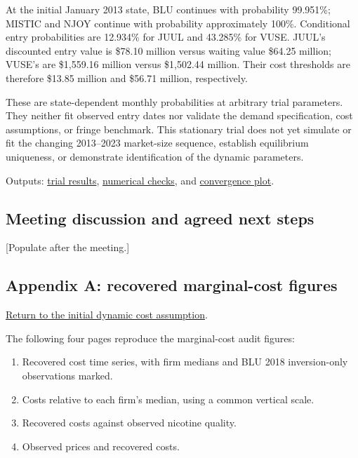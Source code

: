 \documentclass[10pt,]{article}
\providecommand{\tightlist}{%
  \setlength{\itemsep}{0pt}\setlength{\parskip}{0pt}}
\begin{document}
At the initial January 2013 state, BLU continues with probability
99.951\%; MISTIC and NJOY continue with probability approximately 100\%.
Conditional entry probabilities are 12.934\% for JUUL and 43.285\% for
VUSE. JUUL's discounted entry value is \$78.10 million versus waiting
value \$64.25 million; VUSE's are \$1,559.16 million versus \$1,502.44
million. Their cost thresholds are therefore \$13.85 million and \$56.71
million, respectively.

These are state-dependent monthly probabilities at arbitrary trial
parameters. They neither fit observed entry dates nor validate the
demand specification, cost assumptions, or fringe benchmark. This
stationary trial does not yet simulate or fit the changing 2013--2023
market-size sequence, establish equilibrium uniqueness, or demonstrate
identification of the dynamic parameters.

Outputs:
\href{../../output/dynamic_entry_exit/manual_dynamic_trial_2026-11-06/initial_state_results.csv}{trial
results},
\href{../../output/dynamic_entry_exit/manual_dynamic_trial_2026-11-06/dynamic_validation.csv}{numerical
checks}, and
\href{../../output/dynamic_entry_exit/manual_dynamic_trial_2026-11-06/dynamic_convergence.pdf}{convergence
plot}.

\subsection{Meeting discussion and agreed next
steps}\label{meeting-discussion-and-agreed-next-steps}

{[}Populate after the meeting.{]}

\clearpage

\hypertarget{appendix-a-recovered-marginal-cost-figures}{\subsection{Appendix
A: recovered marginal-cost
figures}\label{appendix-a-recovered-marginal-cost-figures}}

\protect\hyperlink{initial-dynamic-cost-assumption-time-invariant-firm-specific-marginal-costs}{Return
to the initial dynamic cost assumption}.

The following four pages reproduce the marginal-cost audit figures:

\begin{enumerate}
\def\labelenumi{\arabic{enumi}.}
\tightlist
\item
  Recovered cost time series, with firm medians and BLU 2018
  inversion-only observations marked.
\item
  Costs relative to each firm's median, using a common vertical scale.
\item
  Recovered costs against observed nicotine quality.
\item
  Observed prices and recovered costs.
\end{enumerate}
\end{document}
